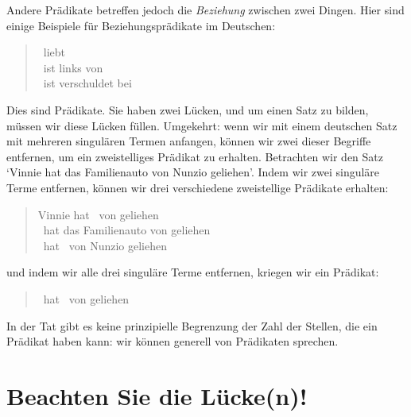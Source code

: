 Andere Prädikate betreffen jedoch die \emph{Beziehung} zwischen zwei Dingen. Hier sind einige Beispiele für Beziehungsprädikate im Deutschen:
	\begin{quote}
		\blank\ liebt \blank\\
		\blank\ ist links von \blank\\
		\blank\ ist verschuldet bei \blank
	\end{quote}
Dies sind  Prädikate. Sie haben zwei Lücken, und um einen Satz zu bilden, müssen wir diese Lücken füllen. Umgekehrt: wenn wir mit einem deutschen Satz mit mehreren singulären Termen anfangen, können wir zwei dieser Begriffe entfernen, um ein zweistelliges Prädikat zu erhalten. Betrachten wir den Satz `Vinnie hat das Familienauto von Nunzio geliehen'. Indem wir zwei singuläre Terme entfernen, können wir drei verschiedene zweistellige Prädikate erhalten:
	\begin{quote}
		Vinnie hat \blank\ von \blank geliehen\\
		\blank\ hat das Familienauto von \blank geliehen\\
		\blank\ hat \blank\ von Nunzio geliehen
	\end{quote}
und indem wir alle drei singuläre Terme entfernen, kriegen wir ein  Prädikat:
	\begin{quote}
		\blank\ hat \blank\ von \blank geliehen
	\end{quote}
In der Tat gibt es keine prinzipielle Begrenzung der Zahl der Stellen, die ein Prädikat haben kann: wir können generell von  Prädikaten sprechen.

\section{Beachten Sie die Lücke(n)!}

